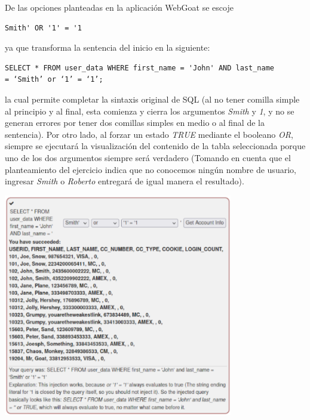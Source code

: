 \documentclass[12pt,oneside,a4paper]{book}
\begin{document}
\begin{enumerate}
\begin{enumerate}
        \hspace{20pt}
        De las opciones planteadas en la aplicación WebGoat se escoje

        \vspace{1em}
        
        \begin{verbatim}
Smith' OR '1' = '1
        \end{verbatim}

        ya que transforma la sentencia del inicio en la siguiente:

        \vspace{1em}
        
        \begin{verbatim}
SELECT * FROM user_data WHERE first_name = 'John' AND last_name
= ‘Smith’ or ‘1’ = ‘1’;
        \end{verbatim}

        la cual permite completar la sintaxis original de SQL (al no tener comilla simple al principio y al final, esta comienza y cierra los argumentos \textit{Smith} y \textit{1}, y no se generan errores por tener dos comillas simples en medio o al final de la sentencia). Por otro lado, al forzar un estado \textit{TRUE} mediante el booleano \textit{OR}, siempre se ejecutará la visualización del contenido de la tabla seleccionada porque uno de los dos argumentos siempre será verdadero (Tomando en cuenta que el planteamiento del ejercicio indica que no conocemos ningún nombre de usuario, ingresar \textit{Smith} o \textit{Roberto} entregará de igual manera el resultado).
        
        \vspace{2em}

        \begin{center}
            \includegraphics[width=10cm]{img/sqli6.png}
            

\end{center}
\end{enumerate}
\end{enumerate}
\end{document}
